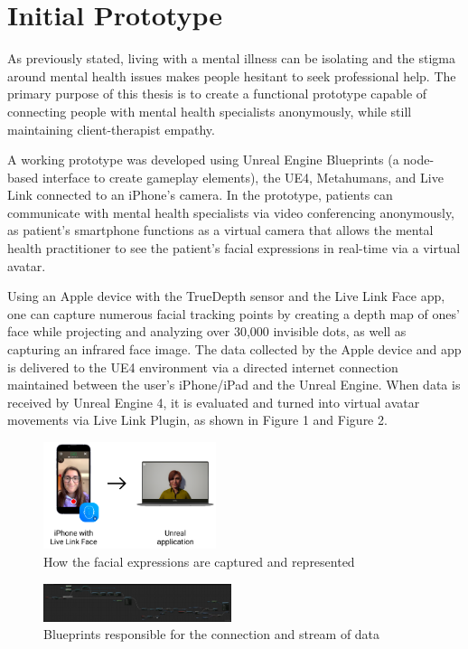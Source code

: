 \section{Initial Prototype}
As previously stated, living with a mental illness can be isolating and the stigma around mental health issues makes people hesitant to seek professional help. The primary purpose of this thesis is to create a functional prototype capable of connecting people with mental health specialists anonymously, while still maintaining client-therapist empathy.

A working prototype was developed using Unreal Engine Blueprints (a node-based interface to create gameplay elements), the UE4, Metahumans, and Live Link connected to an iPhone's camera. In the prototype, patients can communicate with mental health specialists via video conferencing anonymously, as patient's smartphone functions as a virtual camera that allows the mental health practitioner to see the patient's facial expressions in real-time via a virtual avatar. 

Using an Apple device with the TrueDepth sensor and the Live Link Face app, one can capture numerous facial tracking points by creating a depth map of ones’ face while projecting and analyzing over 30,000 invisible dots, as well as capturing an infrared face image. The data collected by the Apple device and app is delivered to the UE4 environment via a directed internet connection maintained between the user's iPhone/iPad and the Unreal Engine. When data is received by Unreal Engine 4, it is evaluated and turned into virtual avatar movements via Live Link Plugin, as shown in Figure 1 and Figure 2.

\begin{figure}[h!]
\includegraphics[width=0.45\textwidth]{figures/howItWorks.png}
\centering
\caption{How the facial expressions are captured and represented}
\end{figure}

\begin{figure}[h!]
\includegraphics[width=0.49\textwidth]{figures/hereItBegins.png}
\centering
\caption{Blueprints responsible for the connection and stream of data}
\end{figure}

